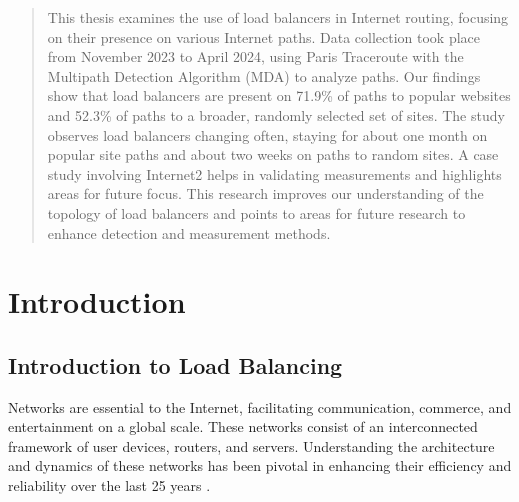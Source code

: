 \documentclass[12pt]{cwru_thesis}
\begin{document}



\printnomenclature

\begin{abstract}

This thesis examines the use of load balancers in Internet routing, focusing on their presence on various Internet paths. Data collection took place from November 2023 to April 2024, using Paris Traceroute with the Multipath Detection Algorithm (MDA) to analyze paths. Our findings show that load balancers are present on 71.9\% of paths to popular websites and 52.3\% of paths to a broader, randomly selected set of sites. The study observes load balancers changing often, staying for about one month on popular site paths and about two weeks on paths to random sites. A case study involving Internet2 helps in validating measurements and highlights areas for future focus. This research improves our understanding of the topology of load balancers and points to areas for future research to enhance detection and measurement methods.

\end{abstract}



\mainmatter

\setcounter{secnumdepth}{2}

\chapter{Introduction} 
\label{chap:intro}

\section{Introduction to Load Balancing}

Networks are essential to the Internet, facilitating communication, commerce, and entertainment on a global scale. These networks consist of an interconnected framework of user devices, routers, and servers. Understanding the architecture and dynamics of these networks has been pivotal in enhancing their efficiency and reliability over the last 25 years \cite{paxson_endtoend96}.
\end{document}
